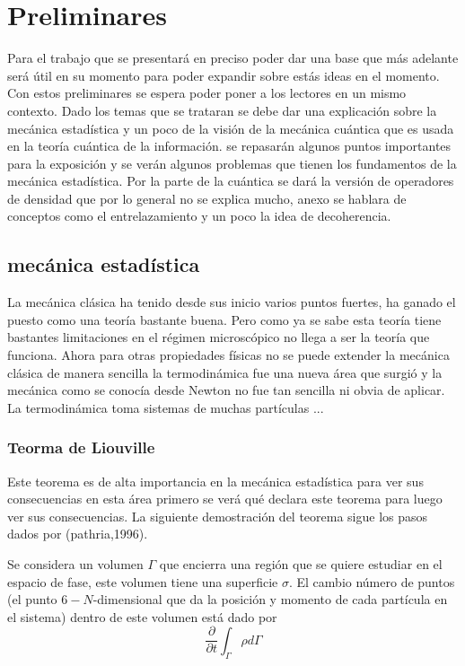\chapter{Preliminares}

Para el trabajo que se presentará en preciso poder dar una base que más adelante será útil  en su momento para poder expandir sobre estás ideas en el momento. Con estos preliminares se espera poder poner a los lectores en un mismo contexto. Dado los temas que se trataran se debe dar una explicación sobre la mecánica estadística y un poco de la visión de la mecánica cuántica que es usada en la teoría cuántica de la información. se repasarán algunos puntos importantes para la exposición y se verán algunos problemas que tienen los fundamentos de la mecánica estadística. Por la parte de la cuántica se dará la versión de operadores de densidad  que por lo general no se explica mucho, anexo se hablara de conceptos como el entrelazamiento y un poco la idea de decoherencia.


\section{mecánica estadística}
La mecánica clásica ha tenido desde sus inicio varios puntos fuertes, ha ganado el puesto como una teoría bastante buena. Pero como ya se sabe esta teoría tiene bastantes limitaciones en el régimen microscópico no llega a ser la teoría que funciona. Ahora para otras propiedades físicas no se puede extender la mecánica clásica de manera sencilla la termodinámica fue una nueva área que surgió y la mecánica como se conocía desde Newton no fue tan 
sencilla ni obvia de aplicar. La termodinámica toma sistemas de muchas partículas ...

\subsection{Teorma de Liouville }
Este teorema es de alta importancia en la mecánica estadística para ver sus consecuencias en esta área primero se verá qué declara este teorema para luego ver sus consecuencias. La siguiente demostración del teorema sigue los pasos dados por (pathria,1996). 

Se considera un volumen $\Gamma$ que encierra una región que se quiere estudiar en el espacio de fase,  este volumen tiene una superficie $\sigma$. El cambio número de puntos (el punto $6-N$-dimensional que da la posición y momento de cada partícula en el sistema) dentro de este volumen está dado por 
\begin{equation}
\frac{\partial}{\partial t} \int_{\Gamma} \rho d\Gamma
\end{equation}

